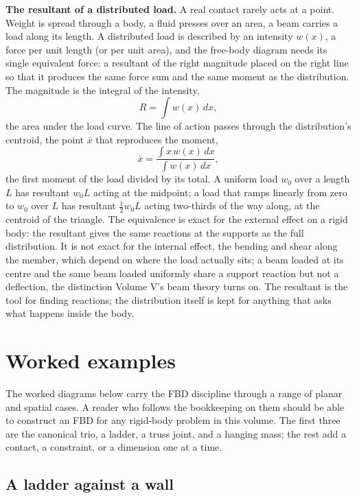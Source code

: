 \begin{mastery}
\textbf{The resultant of a distributed load.} A real contact rarely acts
at a point. Weight is spread through a body, a fluid presses over an area,
a beam carries a load along its length. A distributed load is described by
an intensity $w(x)$, a force per unit length (or per unit area), and the
free-body diagram needs its single equivalent force: a resultant of the
right magnitude placed on the right line so that it produces the same force
sum and the same moment as the distribution. The magnitude is the integral
of the intensity,
\[
R = \int w(x)\,dx,
\]
the area under the load curve. The line of action passes through the
distribution's centroid, the point $\bar{x}$ that reproduces the moment,
\[
\bar{x} = \frac{\int x\,w(x)\,dx}{\int w(x)\,dx},
\]
the first moment of the load divided by its total. A uniform load $w_0$
over a length $L$ has resultant $w_0 L$ acting at the midpoint; a load that
ramps linearly from zero to $w_0$ over $L$ has resultant $\tfrac{1}{2}w_0 L$
acting two-thirds of the way along, at the centroid of the triangle. The
equivalence is exact for the external effect on a rigid body: the resultant
gives the same reactions at the supports as the full distribution. It is
not exact for the internal effect, the bending and shear along the member,
which depend on where the load actually sits; a beam loaded at its centre
and the same beam loaded uniformly share a support reaction but not a
deflection, the distinction Volume V's beam theory turns on. The resultant
is the tool for finding reactions; the distribution itself is kept for
anything that asks what happens inside the body.
\end{mastery}

\section{Worked examples}

The worked diagrams below carry the FBD discipline through a range of
planar and spatial cases. A reader who follows the bookkeeping on them
should be able to construct an FBD for any rigid-body problem in this
volume. The first three are the canonical trio, a ladder, a truss joint,
and a hanging mass; the rest add a contact, a constraint, or a dimension
one at a time.

\subsection{A ladder against a wall}

